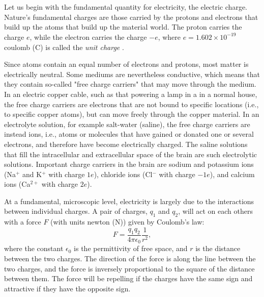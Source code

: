 \section{}
\label{sec:Basics:Charge} 
Let us begin with the fundamental quantity for electricity, the electric charge. Nature's fundamental charges are those carried by the protons and electrons that build up the atoms that build up the material world. The proton carries the charge $e$, while the electron carries the charge $-e$, where $e = 1.602\times10^{-19}$ coulomb (\si{\coulomb}) is called the \textit{unit charge} . 

Since atoms contain an equal number of electrons and protons, most matter is electrically neutral. Some mediums are nevertheless conductive, which means that they contain so-called "free charge carriers" that may move through the medium. In an electric copper cable, such as that powering a lamp in a in a normal house, the free charge carriers are electrons that are not bound to specific locations (i.e., to specific copper atoms), but can move freely through the copper material. In an electrolyte solution, for example salt-water (saline), the free charge carriers are instead ions, i.e., atoms or molecules that have gained or donated one or several electrons, and therefore have become electrically charged. The saline solutions that fill the intracellular and extracellular space of the brain are such electrolytic solutions. Important charge carriers in the brain are sodium and potassium ions (Na$^+$ and K$^+$ with charge $1e$), chloride ions (Cl$^-$ with charge $-1e$), and calcium ions (Ca$^{2+}$ with charge $2e$).

At a fundamental, microscopic level, electricity is largely due to the interactions between individual charges. A pair of charges, $q_1$ and $q_2$, will act on each others with a force $F$ (with units newton (\si{\newton})) given by Coulomb's law:
\begin{equation}
F = \frac{q_1q_2}{4\pi \epsilon_0} \frac{1}{r^2}, 
\label{eq:Basics:CoulombF}
\end{equation}
where the constant $\epsilon_0$ is the permittivity of free space, and $r$ is the distance between the two charges. The direction of the force is along the line between the two charges, and the force is inversely proportional to the square of the distance between them. The force will be repelling if the charges have the same sign and attractive if they have the opposite sign.

